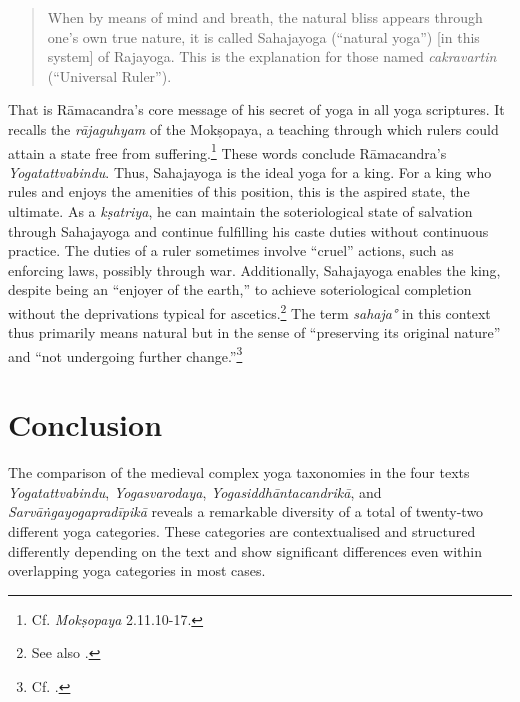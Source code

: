 \begin{quote}
 When by means of mind and breath, the natural bliss appears through one's own true nature, it is called Sahajayoga (``natural yoga'') [in this system] of Rajayoga. This is the explanation for those named \textit{cakravartin} (``Universal Ruler'').
\end{quote}

That is Rāmacandra's core message of his secret of yoga in all yoga scriptures. It recalls the \textit{rājaguhyam} of the Mokṣopaya, a teaching through which rulers could attain a state free from suffering.\footnote{Cf. \emph{Mokṣopaya} 2.11.10-17.\nocite{moskopaya12}} These words conclude Rāmacandra's \emph{Yogatattvabindu}. Thus, Sahajayoga is the ideal yoga for a king. For a king who rules and enjoys the amenities of this position, this is the aspired state, the ultimate. As a \textit{kṣatriya}, he can maintain the soteriological state of salvation through Sahajayoga and continue fulfilling his caste duties without continuous practice. The duties of a ruler sometimes involve ``cruel'' actions, such as enforcing laws, possibly through war. Additionally, Sahajayoga enables the king, despite being an ``enjoyer of the earth,'' to achieve soteriological completion without the deprivations typical for ascetics.\footnote{See also \citeauthor[2006: 121]{hanneder2006}.} The term \textit{sahaja°} in this context thus primarily means natural but in the sense of ``preserving its original nature'' and ``not undergoing further change.''\footnote{Cf. .} 

\section{Conclusion}
\label{comparisonconclusion}
The comparison of the medieval complex yoga taxonomies in the four texts \textit{Yogatattvabindu}, \textit{Yogasvarodaya}, \textit{Yogasiddhāntacandrikā}, and \textit{Sarvāṅgayogapradīpikā} reveals a remarkable diversity of a total of twenty-two different yoga categories. These categories are contextualised and structured differently depending on the text and show significant differences even within overlapping yoga categories in most cases.

